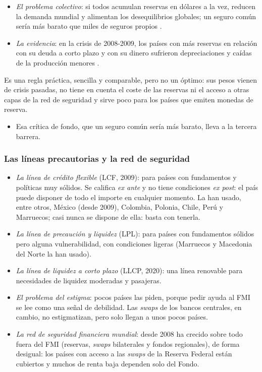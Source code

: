 \documentclass[11pt]{article}
\begin{document}
\begin{anotaciones}
\begin{itemize}
\item \emph{El problema colectivo}: si todos acumulan reservas en dólares a la vez, reducen la demanda mundial y alimentan los desequilibrios globales; un seguro común sería más barato que miles de seguros propios .
\item \emph{La evidencia}: en la crisis de 2008-2009, los países con más reservas en relación con su deuda a corto plazo y con su dinero sufrieron depreciaciones y caídas de la producción menores\nocite{ObstfeldShambaughTaylor2010,FrankelSaravelos2012} .
\end{itemize}
Es una regla práctica, sencilla y comparable, pero no un óptimo: sus pesos vienen de crisis pasadas, no tiene en cuenta el coste de las reservas ni el acceso a otras capas de la red de seguridad y sirve poco para los países que emiten monedas de reserva.
\end{anotaciones}

\begin{itemize}
\item Esa crítica de fondo, que un seguro común sería más barato, lleva a la tercera barrera.
\end{itemize}

\subsubsection{Las líneas precautorias y la red de seguridad}\label{sec:lineas}

\begin{itemize}
\item \emph{La línea de crédito flexible} (LCF, 2009): para países con fundamentos y políticas muy sólidos. Se califica \emph{ex ante} y no tiene condiciones \emph{ex post}: el país puede disponer de todo el importe en cualquier momento. La han usado, entre otros, México (desde 2009), Colombia, Polonia, Chile, Perú y Marruecos; casi nunca se dispone de ella: basta con tenerla.
\item \emph{La línea de precaución y liquidez} (LPL): para países con fundamentos sólidos pero alguna vulnerabilidad, con condiciones ligeras (Marruecos y Macedonia del Norte la han usado).
\item \emph{La línea de liquidez a corto plazo} (LLCP, 2020): una línea renovable para necesidades de liquidez moderadas y pasajeras.
\item \emph{El problema del estigma}: pocos países las piden, porque pedir ayuda al FMI se lee como una señal de debilidad. Las \emph{swaps} de los bancos centrales, en cambio, no estigmatizan, pero solo llegan a unos pocos países.
\item \emph{La red de seguridad financiera mundial}: desde 2008 ha crecido sobre todo fuera del FMI (reservas, \emph{swaps} bilaterales y fondos regionales), de forma desigual: los países con acceso a las \emph{swaps} de la Reserva Federal están cubiertos y muchos de renta baja dependen solo del Fondo\nocite{FMI2016GFSN}.
\end{itemize}
\end{document}
